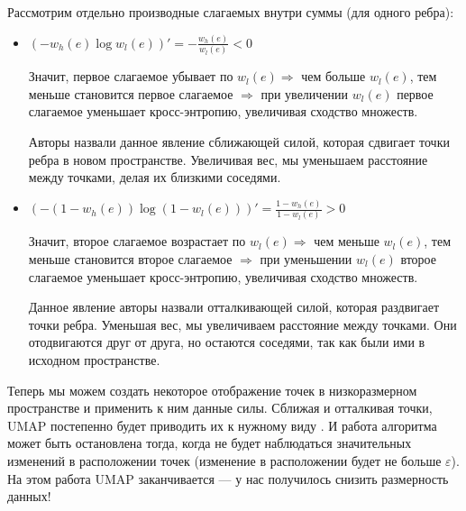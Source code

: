 Рассмотрим отдельно производные слагаемых внутри суммы (для одного ребра):
\begin{itemize}
	\item $\displaystyle (-w_h(e)\log w_l(e))' = - \frac{w_h(e)}{w_l(e)} < 0$
	
	Значит, первое слагаемое убывает по $w_l(e) \Rightarrow$ чем больше $w_l(e)$, тем меньше становится первое слагаемое $\Rightarrow$ при увеличении $w_l(e)$ первое слагаемое уменьшает кросс-энтропию, увеличивая сходство множеств.
	
	Авторы назвали данное явление сближающей силой, которая сдвигает точки ребра в новом пространстве. Увеличивая вес, мы уменьшаем расстояние между точками, делая их близкими соседями.
	
	\item $\displaystyle (-(1 - w_h(e))\log (1 - w_l(e)))' = \frac{1 - w_h(e)}{1 - w_l(e)} > 0$
	
	Значит, второе слагаемое возрастает по $w_l(e) \Rightarrow$ чем меньше $w_l(e)$, тем меньше становится второе слагаемое $\Rightarrow$ при уменьшении $w_l(e)$ второе слагаемое уменьшает кросс-энтропию, увеличивая сходство множеств.
	
	Данное явление авторы назвали отталкивающей силой, которая раздвигает точки ребра. Уменьшая вес, мы увеличиваем расстояние между точками. Они отодвигаются друг от друга, но остаются соседями, так как были ими в исходном пространстве.	
\end{itemize}

Теперь мы можем создать некоторое отображение точек в низкоразмерном пространстве и применить к ним данные силы. Сближая и отталкивая точки, UMAP постепенно будет приводить их к нужному виду \cite{umap}. И работа алгоритма может быть остановлена тогда, когда не будет наблюдаться значительных изменений в расположении точек (изменение в расположении будет не больше $\varepsilon$). На этом работа UMAP заканчивается --- у нас получилось снизить размерность данных!